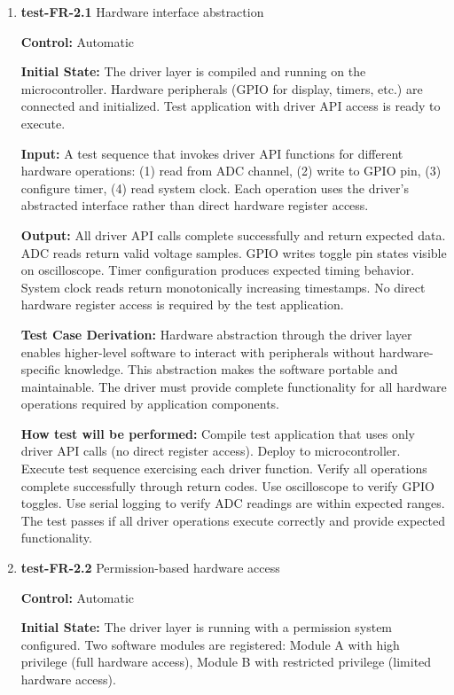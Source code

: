 \documentclass[12pt, titlepage]{article}
\begin{document}
\begin{enumerate}

\item{\textbf{test-FR-2.1} Hardware interface abstraction \\}

\textbf{Control:} Automatic
					
\textbf{Initial State:} 
The driver layer is compiled and running on the microcontroller. Hardware 
peripherals (GPIO for display, timers, etc.) are connected and initialized. 
Test application with driver API access is ready to execute.
					
\textbf{Input:}
A test sequence that invokes driver API functions for different hardware 
operations: (1) read from ADC channel, (2) write to GPIO pin, (3) configure 
timer, (4) read system clock. Each operation uses the driver's abstracted 
interface rather than direct hardware register access.
					
\textbf{Output:}
All driver API calls complete successfully and return expected data. ADC reads 
return valid voltage samples. GPIO writes toggle pin states visible on 
oscilloscope. Timer configuration produces expected timing behavior. System 
clock reads return monotonically increasing timestamps. No direct hardware 
register access is required by the test application.

\textbf{Test Case Derivation:} 
Hardware abstraction through the driver layer enables higher-level software 
to interact with peripherals without hardware-specific knowledge. This abstraction 
makes the software portable and maintainable. The driver must provide complete 
functionality for all hardware operations required by application components.
					
\textbf{How test will be performed:}
Compile test application that uses only driver API calls (no direct register 
access). Deploy to microcontroller. Execute test sequence exercising each driver 
function. Verify all operations complete successfully through return codes. 
Use oscilloscope to verify GPIO toggles. Use serial logging to verify ADC 
readings are within expected ranges. The test passes if all driver operations 
execute correctly and provide expected functionality.

\item{\textbf{test-FR-2.2} Permission-based hardware access\\}

\textbf{Control:} Automatic
					
\textbf{Initial State:} 
The driver layer is running with a permission system configured. Two software 
modules are registered: Module A with high privilege (full hardware access), 
Module B with restricted privilege (limited hardware access).
					

\end{enumerate}
\end{document}
